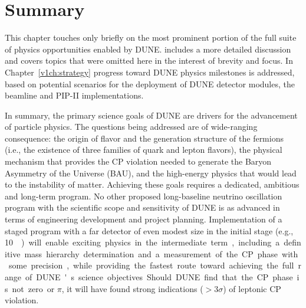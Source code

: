 
%
\section{Summary}


This chapter %
touches only briefly on the most prominent portion of
the full suite of physics opportunities enabled by DUNE.  
\volphys includes a more detailed discussion and covers topics %
that were omitted here in the interest of brevity and focus.  In
Chapter~\ref{v1ch:strategy} progress toward DUNE physics milestones is
addressed, based on potential scenarios for the deployment of DUNE
detector modules, the beamline and PIP-II implementations. 

In summary, the primary science goals of DUNE are drivers for the
advancement of particle physics. The questions being addressed are of
wide-ranging consequence: the origin of flavor and the generation
structure of the fermions (i.e., the existence of three families of
quark and lepton flavors), the physical mechanism that provides the CP
violation needed to generate the Baryon Asymmetry of the Universe
(BAU), and the high-energy physics that would lead to the instability
of matter.  Achieving these goals requires a dedicated, ambitious and
long-term program.  No other proposed long-baseline neutrino
oscillation program with the scientific scope and sensitivity of DUNE
is as advanced in terms of engineering development and project
planning.  Implementation of a staged program with a far detector of
even modest size in the initial stage (e.g., \SI{10}\kt) will enable
exciting physics in the intermediate term, including a definitive mass
hierarchy determination and a measurement of the CP phase with some
precision, while providing the fastest route toward achieving the
full range of DUNE's science objectives.  Should DUNE find that the CP
phase is not zero or $\pi$, it will have found strong indications
($>3\sigma$) of leptonic CP violation.

